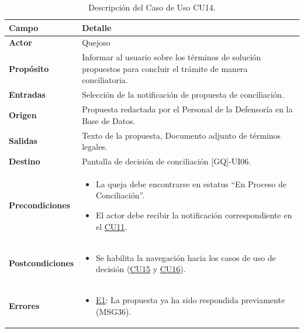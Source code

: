 \begin{appendices}
\begin{table}[htbp]
\centering
\small
{}
\begin{tabular}{|p{3.5cm}|p{10.5cm}|}
\hline
\rowcolor[HTML]{EFEFEF} 
\textbf{Campo} & \textbf{Detalle} \\ \hline
\textbf{Actor} & Quejoso \\ \hline
\textbf{Propósito} & Informar al usuario sobre los términos de solución propuestos para concluir el trámite de manera conciliatoria. \\ \hline
\textbf{Entradas} & Selección de la notificación de propuesta de conciliación. \\ \hline
\textbf{Origen} & Propuesta redactada por el Personal de la Defensoría en la Base de Datos. \\ \hline
\textbf{Salidas} & Texto de la propuesta, Documento adjunto de términos legales. \\ \hline
\textbf{Destino} & Pantalla de decisión de conciliación [GQ]-UI06. \\ \hline
\textbf{Precondiciones} & 
\begin{itemize}[nosep, leftmargin=*]
    \item La queja debe encontrarse en estatus ``En Proceso de Conciliación''.
    \item El actor debe recibir la notificación correspondiente en el \hyperlink{anexo:casos_uso}{CU11}.
\end{itemize} \\ \hline
\textbf{Postcondiciones} & 
\begin{itemize}[nosep, leftmargin=*]
    \item Se habilita la navegación hacia los casos de uso de decisión (\hyperlink{anexo:casos_uso}{CU15} y \hyperlink{anexo:casos_uso}{CU16}).
\end{itemize} \\ \hline
\textbf{Errores} & 
\begin{itemize}[nosep, leftmargin=*]
    \item \hyperlink{err:E19}{E1}: La propuesta ya ha sido respondida previamente (MSG36).
\end{itemize} \\ \hline
\end{tabular}
\caption{Descripción del Caso de Uso CU14.}
\label{tab:cu14_especificacion}
\end{table}


\end{appendices}
